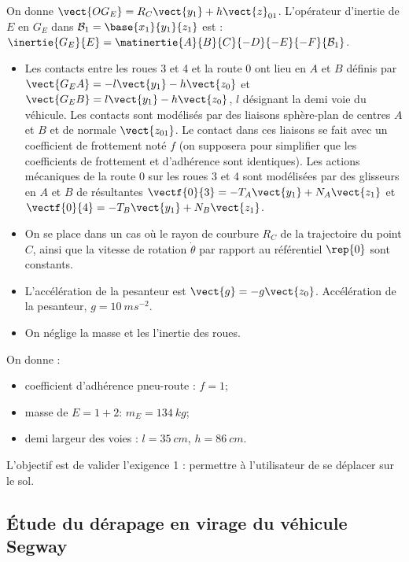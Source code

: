 \begin{multicols}{2}
On donne $\vect{OG_E}=R_C\vect{y_1}+h\vect{z}_{01}$. L'opérateur d'inertie de $E$ en $G_E$ dans $\mathcal{B}_1=\base{x_1}{y_1}{z_1}$ est : 
$\inertie{G_E}{E}=\matinertie{A}{B}{C}{-D}{-E}{-F}{\mathcal{B}_1}$.

\begin{hypo}
\begin{itemize} 
\item Les contacts entre les roues 3 et 4 et la route 0 ont lieu en $A$ et $B$ définis par $\vect{G_EA}=-l\vect{y_1}-h\vect{z_0}$ et $\vect{G_EB}=l\vect{y_1}-h\vect{z_0}$, $l$ désignant la demi voie du véhicule. Les contacts sont modélisés par des liaisons sphère-plan de centres $A$ et $B$ et de normale $\vect{z_{01}}$. Le contact dans ces liaisons se fait avec un coefficient de frottement noté $f$ (on supposera pour simplifier que les coefficients de frottement et d'adhérence sont identiques). Les actions mécaniques de la route 0 sur les roues 3 et 4 sont modélisées par des glisseurs en $A$ et $B$ de résultantes $\vectf{0}{3}=-T_A\vect{y_1}+N_A\vect{z_1}$ et $\vectf{0}{4}=-T_B\vect{y_1}+N_B\vect{z_1}$.
\item On se place dans un cas où le rayon de courbure $R_C$ de la trajectoire du point $C$, ainsi que la vitesse de rotation $\dot{\theta}$ par rapport au référentiel $\rep{0}$ sont constants.
\item L'accélération de la pesanteur est $\vect{g}=-g\vect{z_0}$. Accélération de la pesanteur, $g=\SI{10}{ms^{-2}}$.
\item On néglige la masse et les l'inertie des roues. 
\end{itemize}
\end{hypo}
On donne : 	
\begin{itemize}
\item coefficient d'adhérence pneu-route :  $f=1$;
\item masse de $E=1+2$:  $m_E=\SI{134}{kg}$;
\item demi largeur des voies :  $l=\SI{35}{cm}$,  $h=\SI{86}{cm}$.
\end{itemize}
\fi

\begin{obj}
L'objectif est de valider l'exigence 1 : permettre à l'utilisateur de se déplacer sur le sol.
\end{obj}

\subsection*{Étude du dérapage en virage du véhicule Segway}
\ifprof


\end{multicols}
